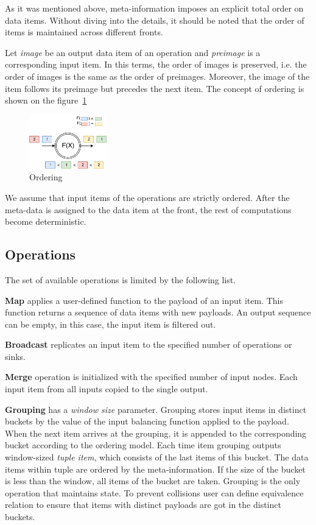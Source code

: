 As it was mentioned above, meta-information imposes an explicit total order on data items. Without diving into the details, it should be noted that the order of items is maintained across different fronts.

Let {\it image} be an output data item of an operation and {\it preimage} is a corresponding input item. In this terms, the order of images is preserved, i.e. the order of images is the same as the order of preimages. Moreover, the image of the item follows its preimage but precedes the next item. The concept of ordering is shown on the figure~\ref{ordering}

\begin{figure}[htbp]
  \centering
  \includegraphics[width=0.30\textwidth]{pics/ordering}
  \caption{Ordering}
  \label {ordering}
\end{figure}

We assume that input items of the operations are strictly ordered. After the meta-data is assigned to the data item at the front, the rest of computations become deterministic.

\subsection{Operations}

The set of available operations is limited by the following list.

{\bf Map} applies a user-defined function to the payload of an input item. This function returns a sequence of data items with new payloads. An output sequence can be empty, in this case, the input item is filtered out.

{\bf Broadcast} replicates an input item to the specified number of operations or sinks. 

{\bf Merge} operation is initialized with the specified number of input nodes. Each input item from all inputs copied to the single output.

{\bf Grouping} has a {\it window size} parameter. Grouping stores input items in distinct buckets by the value of the input balancing function applied to the payload. When the next item arrives at the grouping, it is appended to the corresponding bucket according to the ordering model. Each time item grouping outputs window-sized {\it tuple item}, which consists of the last items of this bucket. The data items within tuple are ordered by the meta-information. If the size of the bucket is less than the window, all items of the bucket are taken. Grouping is the only operation that maintains state. To prevent collisions user can define equivalence relation to ensure that items with distinct payloads are got in the distinct buckets.

